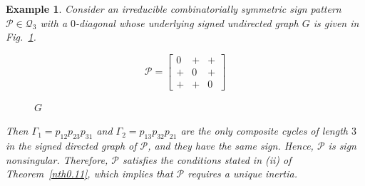 \documentclass[10pt,a4paper]{amsart}
\newtheorem{eg}{Example}[section]
\numberwithin{equation}{section}
\begin{document}
\begin{eg}
	Consider an irreducible combinatorially symmetric sign pattern $\mathcal{P}\in \mathcal{Q}_3$ with a $0$-diagonal whose underlying signed undirected graph $G$ is given in Fig.~\ref{xx2}.
	\begin{figure}[H]
		\centering
		\begin{minipage}{.45\textwidth}
			\vspace{-1cm}
			\[
			\mathcal{P}=
			\begin{bmatrix}
				0 & + & + \\
				+ & 0 & + \\
				+ & + & 0
			\end{bmatrix}
			\]
		\end{minipage}
		\hspace{0.05\textwidth}
		\begin{minipage}{.45\textwidth}
			\centering
			\tikzset{node distance=1cm}
			\caption{$G$}
			\label{xx2}
		\end{minipage}
	\end{figure}
	
	Then $\Gamma_1 = p_{12}p_{23}p_{31}$ and $\Gamma_2 = p_{13}p_{32}p_{21}$ are the only composite cycles of length $3$ in the signed directed graph of $\mathcal{P}$, and they have the same sign. Hence, $\mathcal{P}$ is sign nonsingular. Therefore, $\mathcal{P}$ satisfies the conditions stated in (ii) of Theorem~\ref{nth0.11}, which implies that $\mathcal{P}$ requires a unique inertia.
\end{eg}
\end{document}
